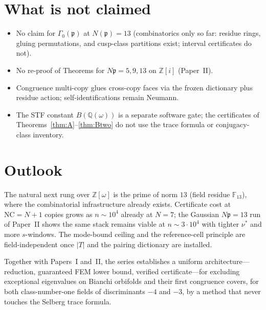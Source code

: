 \documentclass[11pt]{amsart}
\newcommand{\ZZ}{\mathbb{Z}}
\newcommand{\p}{\mathfrak{p}}
\begin{document}
\section{What is not claimed}

\begin{itemize}
\item No claim for $\Gamma_0(\p)$ at $N(\p)=13$ (combinatorics
  only so far: residue rings, gluing permutations, and cusp-class
  partitions exist; interval certificates do not).
\item No re-proof of Theorems for $N\p=5,9,13$ on $\ZZ[i]$ (Paper~II).
\item Congruence multi-copy glues cross-copy faces via the frozen
  dictionary plus residue action; self-identifications remain Neumann.
\item The STF constant $B(\mathbb{Q}(\omega))$ is a separate software
  gate; the certificates of
  Theorems~\ref{thm:A}--\ref{thm:Btwo} do not use
  the trace formula or conjugacy-class inventory.
\end{itemize}

\section{Outlook}

The natural next rung over $\ZZ[\omega]$ is the prime of norm $13$
(field residue $\mathbb{F}_{13}$), where the combinatorial infrastructure
already exists.  Certificate cost at $\mathrm{NC}=N+1$ copies grows as
$n\sim 10^4$ already at $N=7$; the Gaussian $N\p=13$ run of Paper~II
shows the same stack remains viable at $n\sim 3\cdot 10^4$ with tighter
$\nu^*$ and more $s$-windows.  The mode-bound ceiling and the
reference-cell principle are field-independent once $|T|$ and the
pairing dictionary are installed.

Together with Papers~I and~II, the series establishes a uniform
architecture---reduction, guaranteed FEM lower bound, verified
certificate---for excluding exceptional eigenvalues on Bianchi orbifolds
and their first congruence covers, for both class-number-one fields of
discriminants $-4$ and $-3$, by a method that never touches the Selberg
trace formula.
\end{document}
